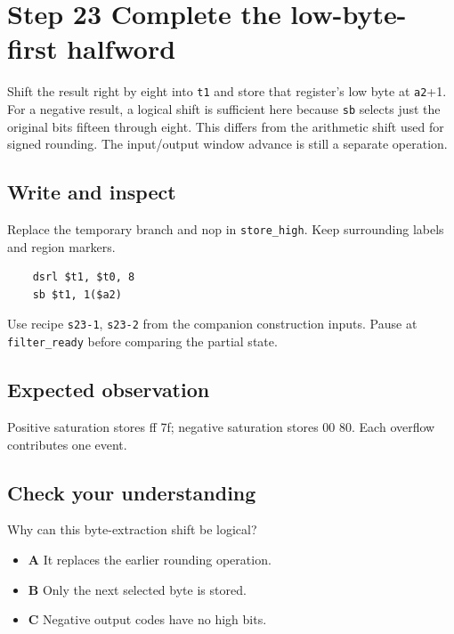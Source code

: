 \section{Step 23 Complete the low-byte-first halfword}\label{fir-s23}

Shift the result right by eight into \texttt{t1} and store that register’s low byte at \texttt{a2}+1. For a negative result, a logical shift is sufficient here because \texttt{sb} selects just the original bits fifteen through eight. This differs from the arithmetic shift used for signed rounding. The input/output window advance is still a separate operation.

\subsection{Write and inspect}
Replace the temporary branch and nop in \texttt{store\_high}. Keep surrounding labels and region markers.

\begin{verbatim}
    dsrl $t1, $t0, 8
    sb $t1, 1($a2)
\end{verbatim}
Use recipe \texttt{s23-1}, \texttt{s23-2} from the companion construction inputs. Pause at \texttt{filter\_ready} before comparing the partial state.

\subsection{Expected observation}
Positive saturation stores ff 7f; negative saturation stores 00 80. Each overflow contributes one event.

\subsection{Check your understanding}
Why can this byte-extraction shift be logical?

\begin{itemize}
  \item \textbf{A} It replaces the earlier rounding operation.
  \item \textbf{B} Only the next selected byte is stored.
  \item \textbf{C} Negative output codes have no high bits.
\end{itemize}
